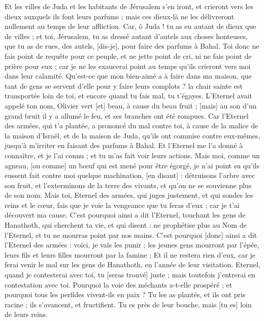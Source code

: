 \begin{multicols}{2}
Et les villes de Juda et les habitants de Jérusalem s'en iront, et crieront vers les dieux auxquels ils font leurs parfums ; mais ces dieux-là ne les délivreront nullement au temps de leur affliction.
Car, ô Juda ! tu as eu autant de dieux que de villes ; et toi, Jérusalem, tu as dressé autant d'autels aux choses honteuses, que tu as de rues, des autels, [dis-je], pour faire des parfums à Bahal.
Toi donc ne fais point de requête pour ce peuple, et ne jette point de cri, ni ne fais point de prière pour eux ; car je ne les exaucerai point au temps qu'ils crieront vers moi dans leur calamité.
Qu'est-ce que mon bien-aimé a à faire dans ma maison, que tant de gens se servent d'elle pour y faire leurs complots ? la chair sainte est transportée loin de toi, et encore quand tu fais mal, tu t'égayes.
L'Eternel avait appelé ton nom, Olivier vert [et] beau, à cause du beau fruit ; [mais] au son d'un grand bruit il y a allumé le feu, et ses branches ont été rompues.
Car l'Eternel des armées, qui t'a plantée, a prononcé du mal contre toi, à cause de la malice de la maison d'Israël, et de la maison de Juda, qu'ils ont commise contre eux-mêmes, jusqu’à m'irriter en faisant des parfums à Bahal.
Et l'Eternel me l'a donné à connaître, et je l'ai connu ; et tu m'as fait voir leurs actions.
Mais moi, comme un agneau, [ou comme] un bœuf qui est mené pour être égorgé, je n'ai point su qu'ils eussent fait contre moi quelque machination, [en disant] : détruisons l'arbre avec son fruit, et l'exterminons de la terre des vivants, et qu'on ne se souvienne plus de son nom.
Mais toi, Eternel des armées, qui juges justement, et qui sondes les reins et le cœur, fais que je voie la vengeance que tu feras d'eux ; car je t'ai découvert ma cause.
C'est pourquoi ainsi a dit l'Eternel, touchant les gens de Hanathoth, qui cherchent ta vie, et qui disent : ne prophétise plus au Nom de l'Eternel, et tu ne mourras point par nos mains.
C'est pourquoi [donc] ainsi a dit l'Eternel des armées : voici, je vais les punir ; les jeunes gens mourront par l'épée, leurs fils et leurs filles mourront par la famine ;
Et il ne restera rien d'eux, car je ferai venir le mal sur les gens de Hanathoth, en l'année de leur visitation.
\VerseOne{}Eternel, quand je contesterai avec toi, tu [seras trouvé] juste ; mais toutefois j'entrerai en contestation avec toi. Pourquoi la voie des méchants a-t-elle prospéré ; et pourquoi tous les perfides vivent-ils en paix ?
Tu les as plantés, et ils ont pris racine ; ils s'avancent, et fructifient. Tu es près de leur bouche, mais [tu es] loin de leurs reins.

\end{multicols}
